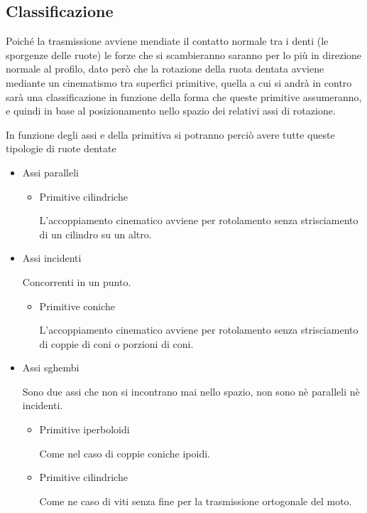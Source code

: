 \documentclass[a4paper, 15pt]{article}
\begin{document}
\subsection{Classificazione}
\begin{adjustwidth}{2in}{}	
	Poiché la trasmissione avviene mendiate il contatto normale tra i denti (le sporgenze delle ruote) le forze che si scambieranno saranno per lo più in direzione normale al profilo, dato però che la rotazione della ruota dentata avviene mediante un cinematismo tra superfici primitive, quella a cui si andrà in contro sarà una classificazione in funzione della forma che queste primitive assumeranno, e quindi in base al posizionamento nello spazio dei relativi assi di rotazione. \newline 
	
	In funzione degli assi e della primitiva si potranno perciò avere tutte queste tipologie di ruote dentate 
	\begin{itemize}
		\item Assi paralleli
		\begin{itemize}
			\item Primitive cilindriche 
			
			L'accoppiamento cinematico avviene per rotolamento senza strisciamento di un cilindro su un altro.
		\end{itemize}
		
		\item Assi incidenti
		
		Concorrenti in un punto.
		\begin{itemize}
			\item Primitive coniche 
			
			L'accoppiamento cinematico avviene per rotolamento senza strisciamento di coppie di coni o porzioni di coni.
		\end{itemize}
		\item Assi sghembi
		
		Sono due assi che non si incontrano mai nello spazio, non sono nè paralleli nè incidenti.
		\begin{itemize}
			\item Primitive iperboloidi 
			
			Come nel caso di coppie coniche ipoidi.
			
			\item Primitive cilindriche
			
			Come ne caso di viti senza fine per la trasmissione ortogonale del moto.
		\end{itemize}
	\end{itemize}
	

\end{adjustwidth}
\end{document}
